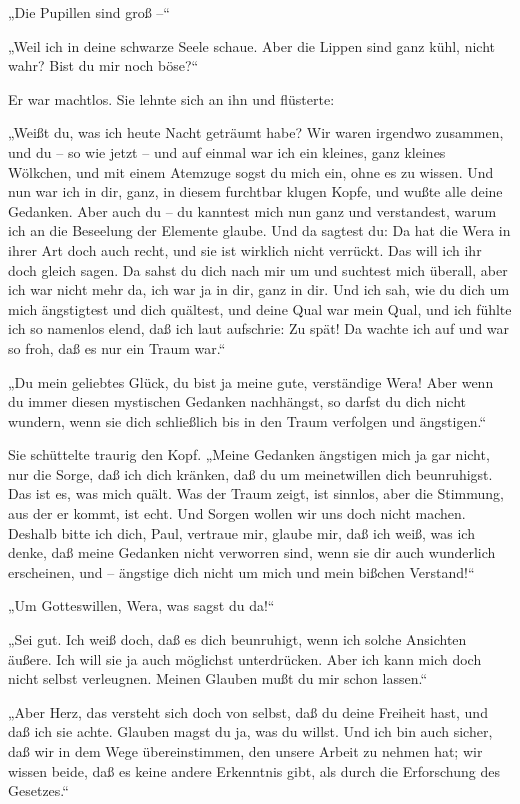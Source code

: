 „Die Pupillen sind groß –“

„Weil ich in deine schwarze Seele schaue. Aber die Lippen sind ganz
kühl, nicht wahr? Bist du mir noch böse?“

Er war machtlos. Sie lehnte sich an ihn und flüsterte:

„Weißt du, was ich heute Nacht geträumt habe? Wir waren irgendwo
zusammen, und du – so wie jetzt – und auf einmal war ich ein
kleines, ganz kleines Wölkchen, und mit einem Atemzuge sogst du
mich ein, ohne es zu wissen. Und nun war ich in dir, ganz, in
diesem furchtbar klugen Kopfe, und wußte alle deine Gedanken. Aber
auch du – du kanntest mich nun ganz und verstandest, warum ich an
die Beseelung der Elemente glaube. Und da sagtest du: Da hat die
Wera in ihrer Art doch auch recht, und sie ist wirklich nicht
verrückt. Das will ich ihr doch gleich sagen. Da sahst du dich nach
mir um und suchtest mich überall, aber ich war nicht mehr da, ich
war ja in dir, ganz in dir. Und ich sah, wie du dich um mich
ängstigtest und dich quältest, und deine Qual war mein Qual, und
ich fühlte ich so namenlos elend, daß ich laut aufschrie: Zu spät!
Da wachte ich auf und war so froh, daß es nur ein Traum war.“

„Du mein geliebtes Glück, du bist ja meine gute, verständige Wera!
Aber wenn du immer diesen mystischen Gedanken nachhängst, so darfst
du dich nicht wundern, wenn sie dich schließlich bis in den Traum
verfolgen und ängstigen.“

Sie schüttelte traurig den Kopf. „Meine Gedanken ängstigen mich ja
gar nicht, nur die Sorge, daß ich dich kränken, daß du um
meinetwillen dich beunruhigst. Das ist es, was mich quält. Was der
Traum zeigt, ist sinnlos, aber die Stimmung, aus der er kommt, ist
echt. Und Sorgen wollen wir uns doch nicht machen. Deshalb bitte
ich dich, Paul, vertraue mir, glaube mir, daß ich weiß, was ich
denke, daß meine Gedanken nicht verworren sind, wenn sie dir auch
wunderlich erscheinen, und – ängstige dich nicht um mich und mein
bißchen Verstand!“

„Um Gotteswillen, Wera, was sagst du da!“

„Sei gut. Ich weiß doch, daß es dich beunruhigt, wenn ich solche
Ansichten äußere. Ich will sie ja auch möglichst unterdrücken. Aber
ich kann mich doch nicht selbst verleugnen. Meinen Glauben mußt du
mir schon lassen.“

„Aber Herz, das versteht sich doch von selbst, daß du deine
Freiheit hast, und daß ich sie achte. Glauben magst du ja, was du
willst. Und ich bin auch sicher, daß wir in dem Wege
übereinstimmen, den unsere Arbeit zu nehmen hat; wir wissen beide,
daß es keine andere Erkenntnis gibt, als durch die Erforschung des
Gesetzes.“

